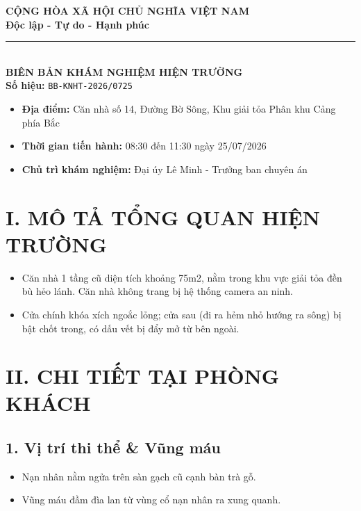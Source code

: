 \documentclass[12pt,a4paper]{article}
\begin{document}
\begin{center}
    \textbf{\Large CỘNG HÒA XÃ HỘI CHỦ NGHĨA VIỆT NAM}\\
    \textbf{\large Độc lập - Tự do - Hạnh phúc}\\
    \rule{8cm}{0.5pt}\\[0.5cm]
    
    \textbf{\LARGE BIÊN BẢN KHÁM NGHIỆM HIỆN TRƯỜNG}\\
    \textbf{Số hiệu:} \texttt{BB-KNHT-2026/0725}
\end{center}

\vspace{0.3cm}

\begin{tcolorbox}[colback=gray!10!white,colframe=black!75!black,title=\textbf{THÔNG TIN THỜI GIAN \& ĐỊA ĐIỂM}]
\begin{itemize}[leftmargin=*]
    \item \textbf{Địa điểm:} Căn nhà số 14, Đường Bờ Sông, Khu giải tỏa Phân khu Cảng phía Bắc
    \item \textbf{Thời gian tiến hành:} 08:30 đến 11:30 ngày 25/07/2026
    \item \textbf{Chủ trì khám nghiệm:} Đại úy Lê Minh - Trưởng ban chuyên án
\end{itemize}
\end{tcolorbox}

\section*{I. MÔ TẢ TỔNG QUAN HIỆN TRƯỜNG}
\begin{itemize}
    \item Căn nhà 1 tầng cũ diện tích khoảng 75m2, nằm trong khu vực giải tỏa đền bù hẻo lánh. Căn nhà không trang bị hệ thống camera an ninh.
    \item Cửa chính khóa xích ngoắc lỏng; cửa sau (đi ra hẻm nhỏ hướng ra sông) bị bật chốt trong, có dấu vết bị đẩy mở từ bên ngoài.
\end{itemize}

\section*{II. CHI TIẾT TẠI PHÒNG KHÁCH}

\subsection*{1. Vị trí thi thể \& Vũng máu}
\begin{itemize}
    \item Nạn nhân nằm ngửa trên sàn gạch cũ cạnh bàn trà gỗ.
    \item Vũng máu đầm đìa lan từ vùng cổ nạn nhân ra xung quanh.
\end{itemize}
\end{document}

